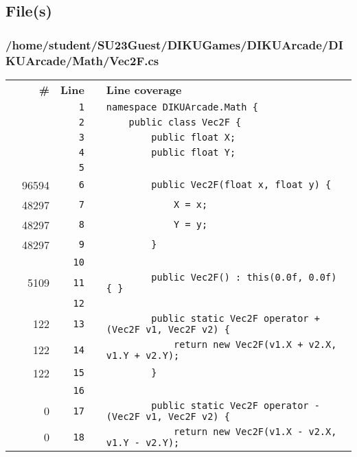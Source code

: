 \documentclass[a4paper,landscape,10pt]{article}
\begin{document}
\subsection{File(s)}
\subsubsection{/home/student/SU23Guest/DIKUGames/DIKUArcade/DIKUArcade/Math/Vec2F.cs}
\begin{longtable}[l]{lrrll}
\textbf{} & \textbf{\#} & \textbf{Line} & \textbf{} & \textbf{Line coverage}\\
\cellcolor{gray} &  & \verb~1~ & & \verb~namespace DIKUArcade.Math {~\\
\cellcolor{gray} &  & \verb~2~ & & \verb~    public class Vec2F {~\\
\cellcolor{gray} &  & \verb~3~ & & \verb~        public float X;~\\
\cellcolor{gray} &  & \verb~4~ & & \verb~        public float Y;~\\
\cellcolor{gray} &  & \verb~5~ & & \verb~~\\
\cellcolor{green} & 96594 & \verb~6~ & & \verb~        public Vec2F(float x, float y) {~\\
\cellcolor{green} & 48297 & \verb~7~ & & \verb~            X = x;~\\
\cellcolor{green} & 48297 & \verb~8~ & & \verb~            Y = y;~\\
\cellcolor{green} & 48297 & \verb~9~ & & \verb~        }~\\
\cellcolor{gray} &  & \verb~10~ & & \verb~~\\
\cellcolor{green} & 5109 & \verb~11~ & & \verb~        public Vec2F() : this(0.0f, 0.0f) { }~\\
\cellcolor{gray} &  & \verb~12~ & & \verb~~\\
\cellcolor{green} & 122 & \verb~13~ & & \verb~        public static Vec2F operator +(Vec2F v1, Vec2F v2) {~\\
\cellcolor{green} & 122 & \verb~14~ & & \verb~            return new Vec2F(v1.X + v2.X, v1.Y + v2.Y);~\\
\cellcolor{green} & 122 & \verb~15~ & & \verb~        }~\\
\cellcolor{gray} &  & \verb~16~ & & \verb~~\\
\cellcolor{red} & 0 & \verb~17~ & & \verb~        public static Vec2F operator -(Vec2F v1, Vec2F v2) {~\\
\cellcolor{red} & 0 & \verb~18~ & & \verb~            return new Vec2F(v1.X - v2.X, v1.Y - v2.Y);~\\

\end{longtable}
\end{document}

